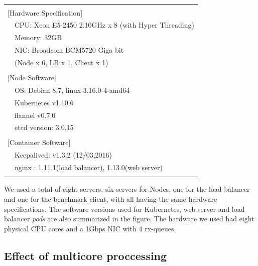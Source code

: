 \begin{table}[]
  \centering
  \begin{tabular}{ll}
    \hline \\
    \multicolumn{2}{l}{[Hardware Specification]}   \\
    & CPU: Xeon E5-2450 2.10GHz x 8 (with Hyper Threading) \\
    & Memory: 32GB \\
    & NIC: Broadcom BCM5720 Giga bit \\
    & (Node x 6, LB x 1, Client x 1) \\
    & \\
    \multicolumn{2}{l}{[Node Software]}  \\
    & OS: Debian 8.7, linux-3.16.0-4-amd64 \\
    & Kubernetes v1.10.6 \\
    & flannel v0.7.0 \\
    & etcd version: 3.0.15 \\
    & \\
    \multicolumn{2}{l}{[Container Software]}   \\
    & Keepalived: v1.3.2 (12/03,2016) \\
    & nginx : 1.11.1(load balancer), 1.13.0(web server) \\
    \\ \hline
  \end{tabular}
  \caption{}
  \label{tab:hw_sw_spec}
\end{table}

We used a total of eight servers; six servers for Nodes, one for the load balancer and one for the benchmark client, with all having the same hardware specifications.
The software versions used for Kubernetes, web server and load balancer {\em pods} are also summarized in the figure.
The hardware we used had eight physical CPU cores and a 1Gbps NIC with 4 rx-queues.


\subsection{Effect of multicore proccessing}

